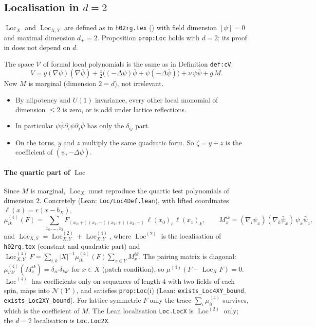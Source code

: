 \documentclass[11pt]{amsart}
\theoremstyle{definition}
\theoremstyle{remark}
\numberwithin{equation}{section}
\newcommand{\cV}{\mathcal{V}}
\newcommand{\cN}{\mathcal{N}}
\newcommand{\Loc}{\operatorname{Loc}}
\newcommand{\hr}{\texttt{h02rg.tex}}
\begin{document}
\subsection{Localisation in $d=2$}
\label{sec:loc}
$\Loc_X$ and $\Loc_{X,Y}$ are defined as in \hr{} (\cite{MR3332939}) with field dimension
$[\psi]=0$ and maximal dimension $d_+=2$. Proposition \texttt{prop:Loc} holds with $d=2$; its
proof in \cite{MR3332939} does not depend on $d$.

The space $\cV$ of formal local polynomials is the same as in Definition \texttt{def:cV}:
\[
  V=y(\nabla\psi)(\nabla\bar\psi)+\tfrac z2\bigl((-\Delta\psi)\bar\psi+\psi(-\Delta\bar\psi)\bigr)+\nu\,\psi\bar\psi+g\,M .
\]
Now $M$ is marginal (dimension $2=d$), not irrelevant.
\begin{itemize}
\item By nilpotency and $U(1)$ invariance, every other local monomial of dimension $\le2$ is
  zero, or is odd under lattice reflections.
\item In particular $\psi\bar\psi\partial_i\psi\partial_j\bar\psi$ has only the $\delta_{ij}$
  part.
\item On the torus, $y$ and $z$ multiply the same quadratic form. So
  $\zeta=y+z$ is the coefficient of $(\psi,-\Delta\bar\psi)$.
\end{itemize}

\paragraph{The quartic part of $\Loc$}
Since $M$ is marginal, $\Loc_X$ must reproduce the quartic test polynomials of dimension $2$.
Concretely (Lean: \texttt{Loc/Loc4Def.lean}), with lifted coordinates $\ell(x)=r(x-b_X)$,
\[
  \mu^{(4)}_{ik}(F)=\sum_{x_0,\dots,x_3}F_{(x_0,+)(x_1,-)(x_2,+)(x_3,-)}\,\ell(x_0)_i\,\ell(x_1)_k ,
  \qquad
  M^{ik}_x=(\nabla_i\psi_x)(\nabla_k\bar\psi_x)\,\psi_x\bar\psi_x ,
\]
and $\Loc_{X,Y}=\Loc^{(2)}_{X,Y}+\Loc^{(4)}_{X,Y}$, where $\Loc^{(2)}$ is the localisation of
\hr{} (constant and quadratic part) and
$\Loc^{(4)}_{X,Y}F=\sum_{i,k}|X|^{-1}\mu^{(4)}_{ik}(F)\sum_{x\in Y}M^{ik}_x$. The pairing
matrix is diagonal: $\mu^{(4)}_{i'k'}(M^{ik}_x)=\delta_{ii'}\delta_{kk'}$ for $x\in X$ (patch
condition), so $\mu^{(4)}(F-\Loc_XF)=0$. $\Loc^{(4)}$ has coefficients only on sequences of
length $4$ with two fields of each spin, maps into $\cN(Y^\square)$, and satisfies
\texttt{prop:Loc}(i) (Lean: \texttt{exists\_Loc4XY\_bound}, \texttt{exists\_Loc2XY\_bound}).
For lattice-symmetric $F$ only the trace $\sum_i\mu^{(4)}_{ii}$ survives, which is the
coefficient of $M$. The Lean localisation \texttt{Loc.LocX} is $\Loc^{(2)}$ only; the
$d=2$ localisation is \texttt{Loc.Loc2X}.
\end{document}
